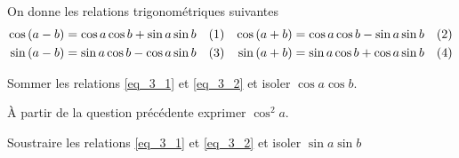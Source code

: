 On donne les relations trigonométriques suivantes
\begin{align*}
	\cos \left( a - b \right) &= \cos a \cos b + \sin a \sin b \Label{eq_3_1} &
	\cos \left( a + b \right) &= \cos a \cos b - \sin a \sin b \Label{eq_3_2} \\
	\sin \left( a - b \right) &= \sin a \cos b - \cos a \sin b \Label{eq_3_3} &
	\sin \left( a + b \right) &= \sin a \cos b + \cos a \sin b \Label{eq_3_4}
\end{align*}


\begin{enonce}
	Sommer les relations \eqref{eq_3_1} et \eqref{eq_3_2} et isoler $\cos a \cos b$.
	\end{enonce}
	
	
		



\begin{enonce}
	À partir de la question précédente exprimer $\cos^2 a$.
	\end{enonce}
	
	
		




\begin{enonce}
	Soustraire les relations \eqref{eq_3_1} et \eqref{eq_3_2} et isoler $\sin a \sin b$
	\end{enonce}
	
	
